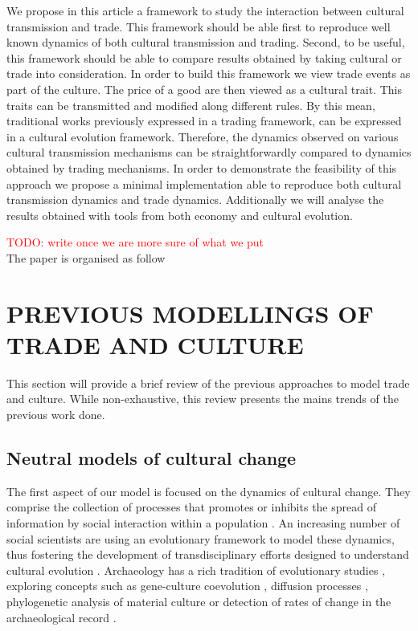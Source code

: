 \documentclass{wscpaperproc}
\newcommand{\memo}[2]{\textcolor{#1}{#2}}
\newcommand{\todo}[1]{\memo{red}{TODO: #1\\}}
\begin{document}
We propose in this article a framework to study the interaction between cultural transmission and trade. This framework should be able first to reproduce well known dynamics of both cultural transmission and trading. Second, to be useful, this framework should be able to compare results obtained by taking cultural or trade into consideration. In order to build this framework we view trade events as part of the culture. The price of a good are then viewed as a cultural trait. This traits can be transmitted and modified along different rules. By this mean, traditional works previously expressed in a trading framework, can be expressed in a cultural evolution framework. Therefore, the dynamics observed on various cultural transmission mechanisms can be straightforwardly compared to dynamics obtained by trading mechanisms. In order to demonstrate the feasibility of this approach we propose a minimal implementation able to reproduce both cultural transmission dynamics and trade dynamics. Additionally we will analyse the results obtained with tools from both economy and cultural evolution.




\todo{write once we are more sure of what we put}
The paper is organised as follow

\section{PREVIOUS MODELLINGS OF TRADE AND CULTURE}

This section will provide a brief review of the previous approaches to model trade and culture. While non-exhaustive, this review presents the mains trends of the previous work done.

\subsection{Neutral models of cultural change}

The first aspect of our model is focused on the dynamics of cultural change. They comprise the collection of processes that promotes or inhibits the spread of information by social interaction within a population \cite[3]{boyd_origin_2005}. An increasing number of social scientists are using an evolutionary framework to model these dynamics, thus fostering the development of transdisciplinary efforts designed to understand cultural evolution \cite{henrich_evolution_2003}. Archaeology has a rich tradition of evolutionary studies \cite{lycett_cultural_2015}, exploring concepts such as gene-culture coevolution \cite{burger_absence_2007}, diffusion processes \cite{fort_synthesis_2012}, phylogenetic analysis of material culture \cite{obrien_cladistics_2001} or detection of rates of change in the archaeological record \cite{premo_cultural_2014}.
\end{document}
